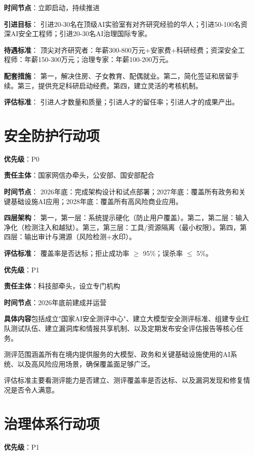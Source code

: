 \textbf{时间节点}：立即启动，持续推进

\textbf{引进目标}：
引进20-30名在顶级AI实验室有对齐研究经验的华人；引进50-100名资深AI安全工程师；引进20-30名AI治理国际专家。

\textbf{待遇标准}：
顶尖对齐研究者：年薪300-800万元+安家费+科研经费；资深安全工程师：年薪150-300万元；治理专家：年薪100-200万元。

\textbf{配套措施}：
第一，解决住房、子女教育、配偶就业。第二，简化签证和居留手续。第三，提供充足科研启动经费。第四，建立灵活的考核机制。

\textbf{评估标准}：
引进人才数量和质量；引进人才的留任率；引进人才的成果产出。

\section{安全防护行动项}

\textbf{优先级}：P0

\textbf{责任主体}：国家网信办牵头，公安部、国安部配合

\textbf{时间节点}：
2026年底：完成架构设计和试点部署；2027年底：覆盖所有政务和关键基础设施AI应用；2028年底：覆盖所有高风险商业应用。

\textbf{四层架构}：
第一，第一层：系统提示硬化（防止用户覆盖）。第二，第二层：输入净化（检测注入和越狱）。第三，第三层：工具/资源隔离（最小权限）。第四，第四层：输出审计与溯源（风险检测+水印）。

\textbf{评估标准}：
覆盖率是否达标；拒止成功率 $\geq$ 95\%；误杀率 $\leq$ 5\%。

\textbf{优先级}：P1

\textbf{责任主体}：科技部牵头，设立专门机构

\textbf{时间节点}：2026年底前建成并运营

\textbf{具体内容}包括成立"国家AI安全测评中心"、建立大模型安全测评标准、组建专业红队测试队伍、建立漏洞库和情报共享机制、以及定期发布安全评估报告等核心任务。

测评范围涵盖所有在境内提供服务的大模型、政务和关键基础设施使用的AI系统、以及高风险应用场景，确保覆盖面足够广泛。

评估标准主要看测评能力是否建立、测评覆盖率是否达标、以及漏洞发现和修复情况是否令人满意。

\section{治理体系行动项}

\textbf{优先级}：P1

